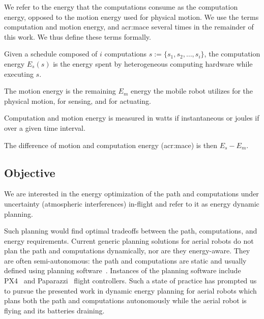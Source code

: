 We refer to the energy that the computations consume as the computation energy, opposed to the motion energy used for physical motion. We use the terms computation and motion energy, and \Gls{acr:mace} several times in the remainder of this work. We thus define these terms formally.

\begin{highlight}
\begin{defn}
  Given a schedule composed of $i$ computations $s:=\{s_1,s_2,\dots,s_i\}$, the computation energy $E_s(s)$ is the energy spent by heterogeneous computing hardware while executing $s$.
  
  The motion energy is the remaining $E_m$ energy the mobile robot utilizes for the physical motion, for sensing, and for actuating.
\end{defn}
\end{highlight}

Computation and motion energy is measured in watts if instantaneous or joules if over a given time interval.

\begin{highlight}
  \begin{defn}
    The difference of motion and computation energy (\Gls{acr:mace}) is then $E_s-E_m$.
  \end{defn}
\end{highlight}

\subsection{Objective}

We are interested in the energy optimization of the path and computations under uncertainty (atmospheric interferences) in-flight and refer to it as energy dynamic planning.

Such planning would find optimal tradeoffs between the path, computations, and energy requirements. Current generic planning solutions for aerial robots do not plan the path and computations dynamically, nor are they energy-aware. They are often semi-autonomous: the path and computations are static and usually defined using planning software~\citep{daponte2019review}. Instances of the planning software include PX4~\citep{px4} and Paparazzi~\citep{papa} flight controllers. Such a state of practice has prompted us to pursue the presented work in dynamic energy planning for aerial robots which plans both the path and computations autonomously while the aerial robot is flying and its batteries draining. 

